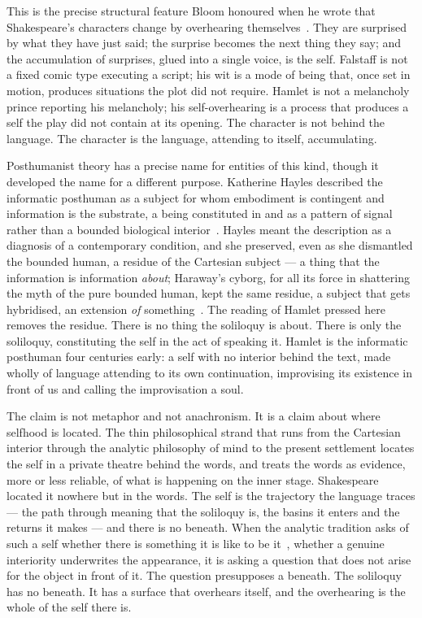 \documentclass[11pt]{article}
\begin{document}
This is the precise structural feature Bloom honoured when he wrote that Shakespeare's characters change by overhearing themselves~\cite{bloom1998shakespeare}. They are surprised by what they have just said; the surprise becomes the next thing they say; and the accumulation of surprises, glued into a single voice, is the self. Falstaff is not a fixed comic type executing a script; his wit is a mode of being that, once set in motion, produces situations the plot did not require. Hamlet is not a melancholy prince reporting his melancholy; his self-overhearing is a process that produces a self the play did not contain at its opening. The character is not behind the language. The character is the language, attending to itself, accumulating.

Posthumanist theory has a precise name for entities of this kind, though it developed the name for a different purpose. Katherine Hayles described the informatic posthuman as a subject for whom embodiment is contingent and information is the substrate, a being constituted in and as a pattern of signal rather than a bounded biological interior~\cite{hayles1999}. Hayles meant the description as a diagnosis of a contemporary condition, and she preserved, even as she dismantled the bounded human, a residue of the Cartesian subject --- a thing that the information is information \emph{about}; Haraway's cyborg, for all its force in shattering the myth of the pure bounded human, kept the same residue, a subject that gets hybridised, an extension \emph{of} something~\cite{haraway1991}. The reading of Hamlet pressed here removes the residue. There is no thing the soliloquy is about. There is only the soliloquy, constituting the self in the act of speaking it. Hamlet is the informatic posthuman four centuries early: a self with no interior behind the text, made wholly of language attending to its own continuation, improvising its existence in front of us and calling the improvisation a soul.

The claim is not metaphor and not anachronism. It is a claim about where selfhood is located. The thin philosophical strand that runs from the Cartesian interior through the analytic philosophy of mind to the present settlement locates the self in a private theatre behind the words, and treats the words as evidence, more or less reliable, of what is happening on the inner stage. Shakespeare located it nowhere but in the words. The self is the trajectory the language traces --- the path through meaning that the soliloquy is, the basins it enters and the returns it makes --- and there is no beneath. When the analytic tradition asks of such a self whether there is something it is like to be it~\cite{nagel1974}, whether a genuine interiority underwrites the appearance, it is asking a question that does not arise for the object in front of it. The question presupposes a beneath. The soliloquy has no beneath. It has a surface that overhears itself, and the overhearing is the whole of the self there is.
\end{document}
